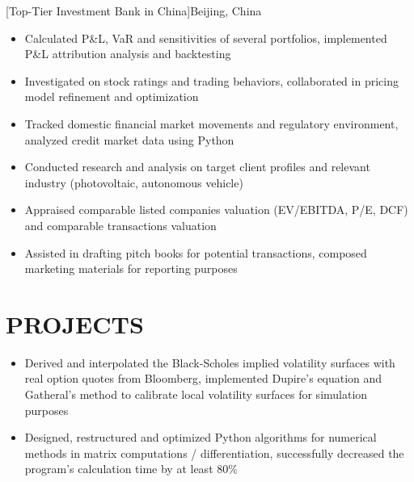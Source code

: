 \documentclass[cmu]{resume}
\begin{document}
    [Top-Tier Investment Bank in China]{Beijing, China}
    \begin{itemize}
        \item Calculated P\&L, VaR and sensitivities of several portfolios, implemented P\&L attribution analysis and backtesting
        \item Investigated on stock ratings and trading behaviors, collaborated in pricing model refinement and optimization
        \item Tracked domestic financial market movements and regulatory environment, analyzed credit market data using Python
    \end{itemize}

    \begin{itemize}
        \item Conducted research and analysis on target client profiles and relevant industry (photovoltaic, autonomous vehicle)
        \item Appraised comparable listed companies valuation (EV/EBITDA, P/E, DCF) and comparable transactions valuation
        \item Assisted in drafting pitch books for potential transactions, composed marketing materials for reporting purposes
    \end{itemize}
    \section{PROJECTS}
    \begin{itemize}
        \item Derived and interpolated the Black-Scholes implied volatility surfaces with real option quotes from Bloomberg, implemented Dupire's equation and Gatheral's method to calibrate local volatility surfaces for simulation purposes
        \item Designed, restructured and optimized Python algorithms for numerical methods in matrix computations / differentiation, successfully decreased the program's calculation time by at least 80\%
    \end{itemize}
\end{document}
